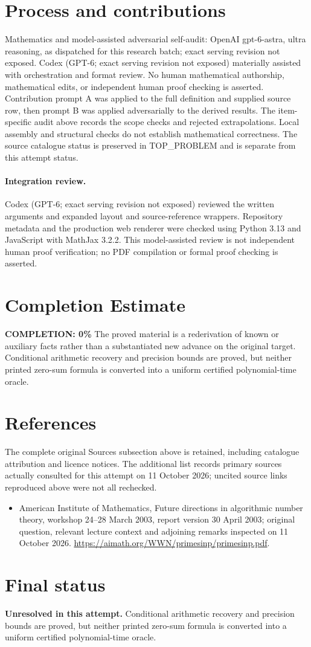\documentclass[11pt]{article}
\begin{document}
\section{Process and contributions}
Mathematics and model-assisted adversarial self-audit: OpenAI gpt-6-astra, ultra reasoning, as dispatched for this research batch; exact serving revision not exposed. Codex (GPT-6; exact serving revision not exposed) materially assisted with orchestration and format review. No human mathematical authorship, mathematical edits, or independent human proof checking is asserted.
Contribution prompt A was applied to the full definition and supplied source row, then prompt B was applied adversarially to the derived results. The item-specific audit above records the scope checks and rejected extrapolations. Local assembly and structural checks do not establish mathematical correctness. The source catalogue status is preserved in TOP\_PROBLEM and is separate from this attempt status.
\paragraph{Integration review.} Codex (GPT-6; exact serving revision not exposed) reviewed the written arguments and expanded layout and source-reference wrappers. Repository metadata and the production web renderer were checked using Python 3.13 and JavaScript with MathJax 3.2.2. This model-assisted review is not independent human proof verification; no PDF compilation or formal proof checking is asserted.

\section{Completion Estimate}
\noindent\textbf{COMPLETION: 0\%}
The proved material is a rederivation of known or auxiliary facts rather than a substantiated new advance on the original target. Conditional arithmetic recovery and precision bounds are proved, but neither printed zero-sum formula is converted into a uniform certified polynomial-time oracle.
\section{References}
The complete original Sources subsection above is retained, including catalogue attribution and licence notices. The additional list records primary sources actually consulted for this attempt on 11 October 2026; uncited source links reproduced above were not all rechecked.
\begin{itemize}
\item American Institute of Mathematics, Future directions in algorithmic number theory, workshop 24--28 March 2003, report version 30 April 2003; original question, relevant lecture context and adjoining remarks inspected on 11 October 2026. \url{https://aimath.org/WWN/primesinp/primesinp.pdf}.
\end{itemize}
\section{Final status}
\textbf{Unresolved in this attempt.} Conditional arithmetic recovery and precision bounds are proved, but neither printed zero-sum formula is converted into a uniform certified polynomial-time oracle.
\end{document}
